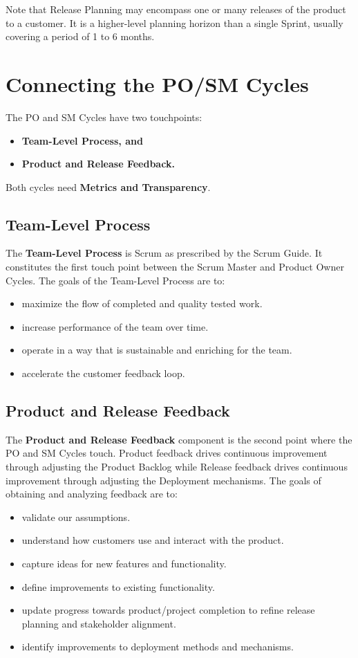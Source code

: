 \documentclass[12pt,a4paper,parskip=full]{scrartcl}
\begin{document}
Note that Release Planning may encompass one or many releases of the product to a customer. It is a higher-level planning horizon than a single Sprint, usually covering a period of 1 to 6 months.

\section{Connecting the PO/SM Cycles}

The PO and SM Cycles have two touchpoints:
\begin{itemize}
	\item \textbf{Team-Level Process, and}
	\item \textbf{Product and Release Feedback.}
\end{itemize}
Both cycles need \textbf{Metrics and Transparency}.

\subsection{Team-Level Process}

The \textbf{Team-Level Process} is Scrum as prescribed by the Scrum Guide. It constitutes the first touch point between the Scrum Master and Product Owner Cycles. The goals of the Team-Level Process are to:

\begin{itemize}
	\item maximize the flow of completed and quality tested work.
	\item increase performance of the team over time.
	\item operate in a way that is sustainable and enriching for the team.
	\item accelerate the customer feedback loop.
\end{itemize}

\subsection{Product and Release Feedback}

The \textbf{Product and Release Feedback} component is the second point where the PO and SM Cycles touch. Product feedback drives continuous improvement through adjusting the Product Backlog while Release feedback drives continuous improvement through adjusting the Deployment mechanisms. The goals of obtaining and analyzing feedback are to:

\begin{itemize}
	\item validate our assumptions.
	\item understand how customers use and interact with the product.
	\item capture ideas for new features and functionality.
	\item define improvements to existing functionality.
	\item update progress towards product/project completion to refine release planning and stakeholder alignment.
	\item identify improvements to deployment methods and mechanisms.
\end{itemize}
\end{document}
